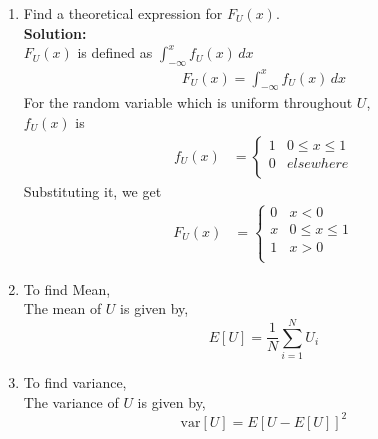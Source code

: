 \documentclass[journal,15pt,twocolumn]{IEEEtran}
\providecommand{\sbrak}[1]{\ensuremath{{}\left[#1\right]}}
\newcommand{\solution}{\noindent \textbf{Solution: }}
\begin{document}
\begin{enumerate}
%
\item
Find a  theoretical expression for $F_{U}(x)$.\\
\solution \\
$F_{U}(x)$ is defined as $\int_{-\infty}^{x} f_{U}(x)\,dx$
\begin{align} 
 F_{U}(x)= \int_{-\infty}^{x} f_{U}(x)\,dx
\end{align}
For the random variable which is uniform throughout $U$,\\ $f_{U}(x)$ is 
\begin{align}
	f_U(x) &= 
	\begin{cases}
	1 &  0 \le x \le  1
	\\
	0 & elsewhere
	\\
	\end{cases}
\end{align}
Substituting it, we get
\begin{align}
	F_U(x) &= 
	\begin{cases}
	0 & x < 0
	\\	
	x & 0 \le x \le  1
	\\
	1 & x > 0
	\\
	\end{cases}
	\label{eq:cdf_uniform}
\end{align}
\item To find Mean, \\ 
The mean of $U$ is given by,
%
\begin{equation}
E\sbrak{U} = \frac{1}{N}\sum_{i=1}^{N}U_i
\end{equation}
%
\item To find variance,\\
The variance of  $U$ is given by,
%
\begin{equation}
\text{var}\sbrak{U} = E\sbrak{U- E\sbrak{U}}^2 
\end{equation}


\end{enumerate}
\end{document}
